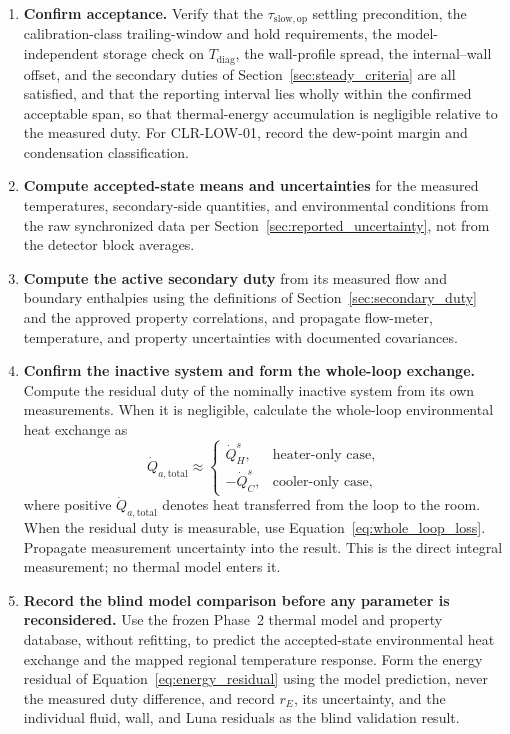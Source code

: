 \documentclass[11pt]{article}
\newcommand{\Tdiag}{T_{\mathrm{diag}}}
\newcommand{\QHs}{\dot Q_{H}^{s}}
\newcommand{\QCs}{\dot Q_{C}^{s}}
\begin{document}
\begin{enumerate}
    \item \textbf{Confirm acceptance.} Verify that the $\tau_{\mathrm{slow,op}}$ settling precondition, the calibration-class trailing-window and hold requirements, the model-independent storage check on $\Tdiag$, the wall-profile spread, the internal--wall offset, and the secondary duties of Section~\ref{sec:steady_criteria} are all satisfied, and that the reporting interval lies wholly within the confirmed acceptable span, so that thermal-energy accumulation is negligible relative to the measured duty. For CLR-LOW-01, record the dew-point margin and condensation classification.

    \item \textbf{Compute accepted-state means and uncertainties} for the measured temperatures, secondary-side quantities, and environmental conditions from the raw synchronized data per Section~\ref{sec:reported_uncertainty}, not from the detector block averages.

    \item \textbf{Compute the active secondary duty} from its measured flow and boundary enthalpies using the definitions of Section~\ref{sec:secondary_duty} and the approved property correlations, and propagate flow-meter, temperature, and property uncertainties with documented covariances.

    \item \textbf{Confirm the inactive system and form the whole-loop exchange.} Compute the residual duty of the nominally inactive system from its own measurements. When it is negligible, calculate the whole-loop environmental heat exchange as
    \begin{equation}
        \dot Q_{a,\mathrm{total}}
        \approx
        \begin{cases}
            \QHs,  & \text{heater-only case}, \\[4pt]
            -\QCs, & \text{cooler-only case},
        \end{cases}
    \end{equation}
    where positive $\dot Q_{a,\mathrm{total}}$ denotes heat transferred from the loop to the room. When the residual duty is measurable, use Equation~\eqref{eq:whole_loop_loss}. Propagate measurement uncertainty into the result. This is the direct integral measurement; no thermal model enters it.

    \item \textbf{Record the blind model comparison before any parameter is reconsidered.} Use the frozen Phase~2 thermal model and property database, without refitting, to predict the accepted-state environmental heat exchange and the mapped regional temperature response. Form the energy residual of Equation~\eqref{eq:energy_residual} using the model prediction, never the measured duty difference, and record $r_E$, its uncertainty, and the individual fluid, wall, and Luna residuals as the blind validation result.


\end{enumerate}
\end{document}

